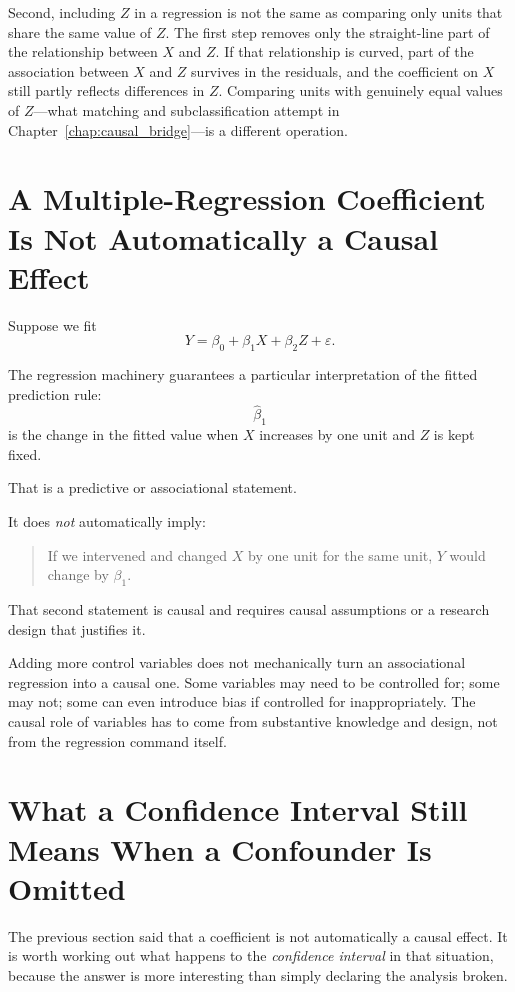 \documentclass[11pt]{report}
\begin{document}
Second, including \(Z\) in a regression is not the same as comparing only units that share the same value of \(Z\). The first step removes only the straight-line part of the relationship between \(X\) and \(Z\). If that relationship is curved, part of the association between \(X\) and \(Z\) survives in the residuals, and the coefficient on \(X\) still partly reflects differences in \(Z\). Comparing units with genuinely equal values of \(Z\)---what matching and subclassification attempt in Chapter~\ref{chap:causal_bridge}---is a different operation.

\section{A Multiple-Regression Coefficient Is Not Automatically a Causal Effect}

Suppose we fit
\[
Y=\beta_0+\beta_1X+\beta_2Z+\varepsilon.
\]

The regression machinery guarantees a particular interpretation of the fitted prediction rule:
\[
\widehat{\beta}_1
\]
is the change in the fitted value when \(X\) increases by one unit and \(Z\) is kept fixed.

That is a predictive or associational statement.

It does \emph{not} automatically imply:

\begin{quote}
If we intervened and changed \(X\) by one unit for the same unit, \(Y\) would change by \(\beta_1\).
\end{quote}

That second statement is causal and requires causal assumptions or a research design that justifies it.

Adding more control variables does not mechanically turn an associational regression into a causal one. Some variables may need to be controlled for; some may not; some can even introduce bias if controlled for inappropriately. The causal role of variables has to come from substantive knowledge and design, not from the regression command itself.

\section{What a Confidence Interval Still Means When a Confounder Is Omitted}

The previous section said that a coefficient is not automatically a causal effect. It is worth working out what happens to the \emph{confidence interval} in that situation, because the answer is more interesting than simply declaring the analysis broken.
\end{document}

